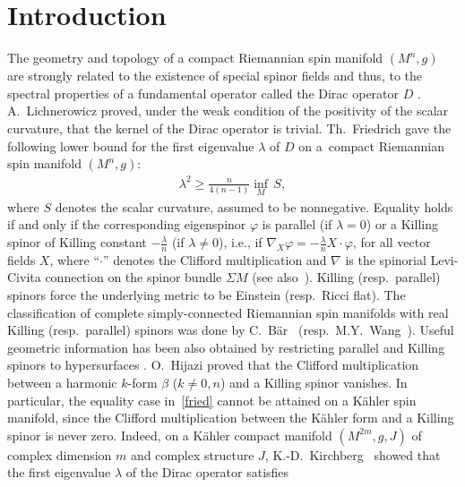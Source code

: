 \documentclass[pdftex]{sigma}
\numberwithin{equation}{section}
\theoremstyle{definition}
\begin{document}


\section{Introduction}

The geometry and topology of a compact Riemannian spin manifold $(M^n, g)$ are strongly related to the existence of special spinor f\/ields and thus, to the spectral properties of a fundamental operator called the Dirac operator $D$ \cite{AS, lich0}.
A.~Lichnerowicz \cite{lich0} proved, under the weak condition of the positivity of the scalar curvature, that the kernel of the Dirac operator is trivial. Th.~Friedrich \cite{fr1} gave the following lower bound for the f\/irst eigenvalue $\lambda$ of $D$ on a~compact Riemannian spin manifold $(M^n, g)$:
\begin{gather}\label{fried}
\lambda^2\geq\frac{n}{4(n-1)}\underset{M}{\inf}\, S,
\end{gather}
where $S$ denotes the  scalar curvature, assumed to be nonnegative. Equality holds if and only if the corresponding eigenspinor $\varphi$ is parallel (if $\lambda=0$) or a Killing spinor of Killing constant $-\frac{\lambda}{n}$ (if $\lambda\neq0$), i.e., if $\nabla_X\varphi = -\frac{\lambda}{n} X\cdot\varphi$, for all vector f\/ields $X$, where ``$\cdot$'' denotes the Clif\/ford multiplication and $\nabla$  is the spinorial Levi-Civita connection on the spinor bundle $\Sigma M$ (see also~\cite{hijconf}). Killing (resp.\ parallel) spinors force the underlying metric to be Einstein  (resp.\ Ricci f\/lat).  The classif\/ication of complete simply-connected Riemannian spin manifolds with real Killing (resp.\ parallel) spinors was done by C.~B\"ar~\cite{baer} (resp.\ M.Y.~Wang~\cite{wang}). Useful geometric information has been also obtained by restricting parallel and Killing spinors to hypersurfaces \cite{Ba, HMZ1, HMZ2, HMZ02, HZ1, HZ2}. O.~Hijazi  proved  that the Clif\/ford multiplication between  a harmonic  $k$-form $\beta$  ($k \neq 0, n$) and a Killing spinor vanishes. In particular, the equality case  in~\eqref{fried} cannot be attained on a  K\"ahler spin manifold, since the Clif\/ford multiplication between the K\"ahler form and a Killing spinor is never zero.
Indeed, on a K\"ahler compact manifold $(M^{2m},g,J)$ of complex dimension $m$ and  complex structure $J$, K.-D.~Kirchberg~\cite{kirch86}  showed that the f\/irst  eigenvalue $\lambda$ of the Dirac operator satisf\/ies
\end{document}
